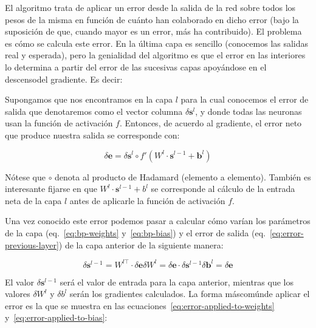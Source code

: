 El algoritmo trata de aplicar un error desde la salida de la red sobre todos los pesos de la misma en función de cuánto han colaborado en dicho error (bajo la suposición de que, cuando mayor es un error, más ha contribuido). El problema es cómo se calcula este error. En la última capa es sencillo (conocemos las salidas real y esperada), pero la genialidad del algoritmo es que el error en las interiores lo determina a partir del error de las sucesivas capas apoyándose en el descensodel gradiente. Es decir:

Supongamos que nos encontramos en la capa $l$ para la cual conocemos el error de salida que denotaremos como el vector columna $\delta \mathbf{s}^l$, y donde todas las neuronas usan la función de activación $f$. Entonces, de acuerdo al gradiente, el error neto que produce nuestra salida se corresponde con:

\begin{equation}
	\delta \mathbf{e} = \delta \mathbf{s}^l \circ f'(W^l \cdot \mathbf{s}^{l-1} + \mathbf{b}^l)
\end{equation}

Nótese que $\circ$ denota al producto de Hadamard (elemento a elemento). También es interesante fijarse en que $W^l \cdot \mathbf{s}^{l-1} + b^l$ se corresponde al cálculo de la entrada neta de la capa $l$ antes de aplicarle la función de activación $f$.

Una vez conocido este error podemos pasar a calcular cómo varían los parámetros de la capa (eq.~\ref{eq:bp-weights} y~\ref{eq:bp-bias}) y el error de salida (eq.~\ref{eq:error-previous-layer}) de la capa anterior de la siguiente manera:

\begin{subequations}
	\begin{equation}
		\delta \mathbf{s}^{l-1} = W^{l\top} \cdot \delta \mathbf{e} \label{eq:error-previous-layer}
	\end{equation}
	\begin{equation}
		\delta W^l = \delta \mathbf{e} \cdot \delta \mathbf{s}^{l-1} \label{eq:bp-weights}
	\end{equation}
	\begin{equation}
		\delta \mathbf{b}^l = \delta \mathbf{e} \label{eq:bp-bias}
	\end{equation}
\end{subequations}

El valor $\delta \mathbf{s}^{l-1}$ será el valor de entrada para la capa anterior, mientras que los valores $\delta W^l$ y $\delta b^l$ serán los gradientes calculados. La forma máscomúnde aplicar el error es la que se muestra en las ecuaciones~\ref{eq:error-applied-to-weights} y~\ref{eq:error-applied-to-bias}:

